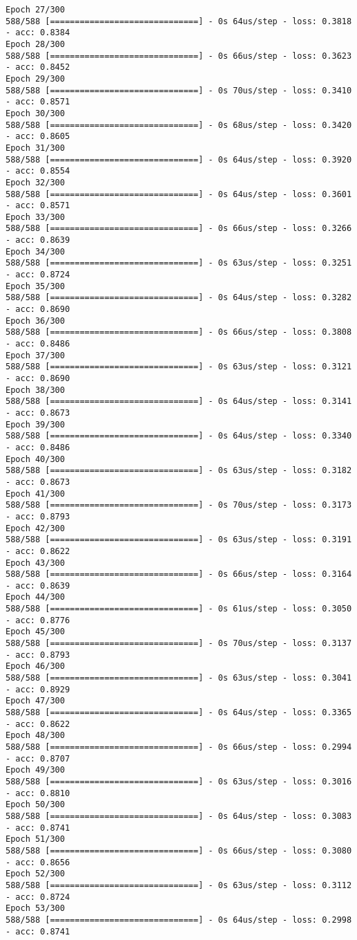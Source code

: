\documentclass[11pt]{article}
\begin{document}
\begin{Verbatim}[commandchars=\\\{\}]
Epoch 27/300
588/588 [==============================] - 0s 64us/step - loss: 0.3818 - acc: 0.8384
Epoch 28/300
588/588 [==============================] - 0s 66us/step - loss: 0.3623 - acc: 0.8452
Epoch 29/300
588/588 [==============================] - 0s 70us/step - loss: 0.3410 - acc: 0.8571
Epoch 30/300
588/588 [==============================] - 0s 68us/step - loss: 0.3420 - acc: 0.8605
Epoch 31/300
588/588 [==============================] - 0s 64us/step - loss: 0.3920 - acc: 0.8554
Epoch 32/300
588/588 [==============================] - 0s 64us/step - loss: 0.3601 - acc: 0.8571
Epoch 33/300
588/588 [==============================] - 0s 66us/step - loss: 0.3266 - acc: 0.8639
Epoch 34/300
588/588 [==============================] - 0s 63us/step - loss: 0.3251 - acc: 0.8724
Epoch 35/300
588/588 [==============================] - 0s 64us/step - loss: 0.3282 - acc: 0.8690
Epoch 36/300
588/588 [==============================] - 0s 66us/step - loss: 0.3808 - acc: 0.8486
Epoch 37/300
588/588 [==============================] - 0s 63us/step - loss: 0.3121 - acc: 0.8690
Epoch 38/300
588/588 [==============================] - 0s 64us/step - loss: 0.3141 - acc: 0.8673
Epoch 39/300
588/588 [==============================] - 0s 64us/step - loss: 0.3340 - acc: 0.8486
Epoch 40/300
588/588 [==============================] - 0s 63us/step - loss: 0.3182 - acc: 0.8673
Epoch 41/300
588/588 [==============================] - 0s 70us/step - loss: 0.3173 - acc: 0.8793
Epoch 42/300
588/588 [==============================] - 0s 63us/step - loss: 0.3191 - acc: 0.8622
Epoch 43/300
588/588 [==============================] - 0s 66us/step - loss: 0.3164 - acc: 0.8639
Epoch 44/300
588/588 [==============================] - 0s 61us/step - loss: 0.3050 - acc: 0.8776
Epoch 45/300
588/588 [==============================] - 0s 70us/step - loss: 0.3137 - acc: 0.8793
Epoch 46/300
588/588 [==============================] - 0s 63us/step - loss: 0.3041 - acc: 0.8929
Epoch 47/300
588/588 [==============================] - 0s 64us/step - loss: 0.3365 - acc: 0.8622
Epoch 48/300
588/588 [==============================] - 0s 66us/step - loss: 0.2994 - acc: 0.8707
Epoch 49/300
588/588 [==============================] - 0s 63us/step - loss: 0.3016 - acc: 0.8810
Epoch 50/300
588/588 [==============================] - 0s 64us/step - loss: 0.3083 - acc: 0.8741
Epoch 51/300
588/588 [==============================] - 0s 66us/step - loss: 0.3080 - acc: 0.8656
Epoch 52/300
588/588 [==============================] - 0s 63us/step - loss: 0.3112 - acc: 0.8724
Epoch 53/300
588/588 [==============================] - 0s 64us/step - loss: 0.2998 - acc: 0.8741

\end{Verbatim}
\end{document}
